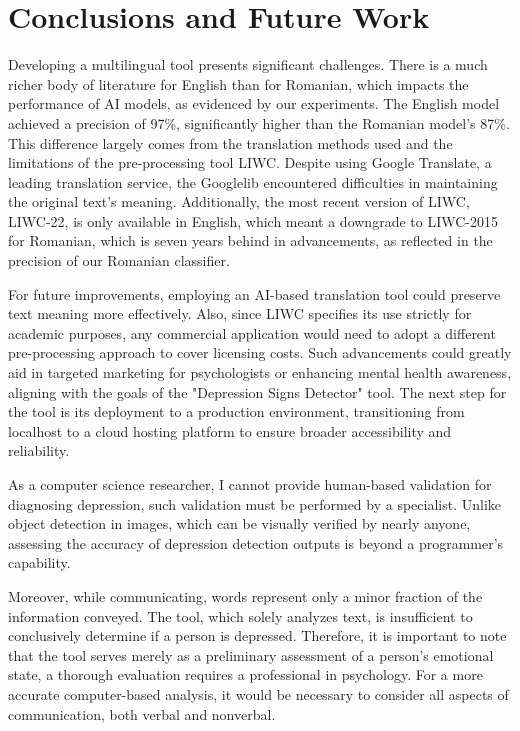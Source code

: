 \chapter{Conclusions and Future Work}
\label{conclusions}

\quad Developing a multilingual tool presents significant challenges. There is a much richer body of literature for English than for Romanian, which impacts the performance of AI models, as evidenced by our experiments. The English model achieved a precision of 97\%, significantly higher than the Romanian model's 87\%. This difference largely comes from the translation methods used and the limitations of the pre-processing tool LIWC. Despite using Google Translate, a leading translation service, the Googlelib \cite{googletranslib} encountered difficulties in maintaining the original text's meaning. Additionally, the most recent version of LIWC, LIWC-22, is only available in English, which meant a downgrade to LIWC-2015 for Romanian, which is seven years behind in advancements, as reflected in the precision of our Romanian classifier.

For future improvements, employing an AI-based translation tool could preserve text meaning more effectively. Also, since LIWC \cite{boyd2022development} specifies its use strictly for academic purposes, any commercial application would need to adopt a different pre-processing approach to cover licensing costs. Such advancements could greatly aid in targeted marketing for psychologists or enhancing mental health awareness, aligning with the goals of the "Depression Signs Detector" tool. The next step for the tool is its deployment to a production environment, transitioning from localhost to a cloud hosting platform to ensure broader accessibility and reliability.

As a computer science researcher, I cannot provide human-based validation for diagnosing depression, such validation must be performed by a specialist. Unlike object detection in images, which can be visually verified by nearly anyone, assessing the accuracy of depression detection outputs is beyond a programmer’s capability.

Moreover, while communicating, words represent only a minor fraction of the information conveyed. The tool, which solely analyzes text, is insufficient to conclusively determine if a person is depressed. Therefore, it is important to note that the tool serves merely as a preliminary assessment of a person’s emotional state, a thorough evaluation requires a professional in psychology. For a more accurate computer-based analysis, it would be necessary to consider all aspects of communication, both verbal and nonverbal.

